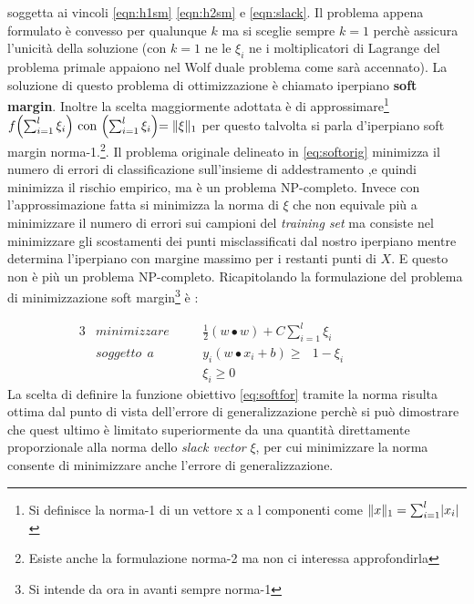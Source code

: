 soggetta ai vincoli \eqref{eqn:h1sm} \eqref{eqn:h2sm} e \eqref{eqn:slack}. Il problema appena formulato è convesso  per qualunque $k$ ma si sceglie sempre $k=1$ perchè assicura l'unicità della soluzione (con $k=1$ ne le $\xi_i$ ne i moltiplicatori di Lagrange del problema primale appaiono nel Wolf duale problema come sarà accennato). La soluzione di questo problema di ottimizzazione è chiamato iperpiano \textbf{soft margin}. Inoltre la scelta maggiormente adottata è di approssimare\footnote{Si definisce la norma-1 di un vettore x a l componenti come $\lVert x\rVert_1 = \sum_{i=1}^{l}\lvert x_i\rvert$} $f\Bigl(\sum_{i=1}^{l}\xi_i\Bigl) \text{ con } \Bigl(\sum_{i=1}^{l}\xi_i\Bigl) = \lVert\xi\rVert_1$ per questo talvolta si parla d'iperpiano soft margin norma-1.\footnote{Esiste anche la formulazione norma-2 ma non ci interessa approfondirla}. Il problema originale delineato in \eqref{eq:softorig}  minimizza il numero di errori di classificazione sull'insieme di addestramento ,e quindi minimizza il rischio empirico, ma è un problema NP-completo. Invece con l'approssimazione fatta si minimizza la norma di $\xi$  che non equivale più a minimizzare il numero di errori sui campioni del \textit{training set} ma consiste nel minimizzare gli scostamenti dei punti misclassificati dal nostro iperpiano  mentre determina l'iperpiano con margine massimo  per i restanti punti di $X$. E questo non è più un problema NP-completo. Ricapitolando la formulazione del problema di minimizzazione soft margin\footnote{Si intende da ora in avanti sempre norma-1} è :


\begin{alignat}{3}
\label{eq:softfor}
&minimizzare \quad&&\frac{1}{2}(w \bullet w) + C\sum_{i=1}^{l}\xi_i \\
\label{eq:softvinc}
&soggetto \:\:a &&y_i(w \bullet x_i + b) \geq \:\:\:1-\xi_i \qquad \qquad \\
&\:&&\xi_i \geq 0 \label{eq:softvin2}
\end{alignat}
La scelta di definire la funzione obiettivo \eqref{eq:softfor} tramite la norma risulta ottima dal punto di vista dell'errore di generalizzazione perchè si può dimostrare che quest ultimo è limitato superiormente da una quantità direttamente proporzionale alla norma dello \textit{slack vector} $\xi$, per cui minimizzare la norma consente di minimizzare anche l'errore di generalizzazione.

